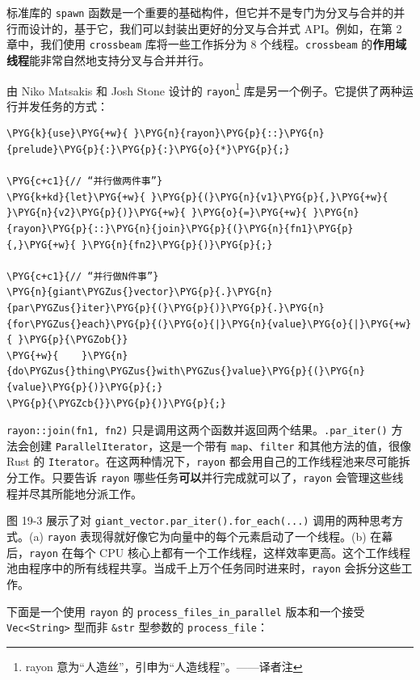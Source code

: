 标准库的 \texttt{spawn} 函数是一个重要的基础构件，但它并不是专门为分叉与合并的并行而设计的，基于它，我们可以封装出更好的分叉与合并式 API。例如，在第 2 章中，我们使用 \texttt{crossbeam} 库将一些工作拆分为 8 个线程。\texttt{crossbeam} 的\textbf{作用域线程}能非常自然地支持分叉与合并并行。

由 Niko Matsakis 和 Josh Stone 设计的 \texttt{rayon}\footnote{rayon 意为“人造丝”，引申为“人造线程”。——译者注} 库是另一个例子。它提供了两种运行并发任务的方式：

\begin{Verbatim}[commandchars=\\\{\},breaklines=true,breakanywhere=true,fontsize=\codefont,xleftmargin=17bp]
\PYG{k}{use}\PYG{+w}{ }\PYG{n}{rayon}\PYG{p}{::}\PYG{n}{prelude}\PYG{p}{:}\PYG{p}{:}\PYG{o}{*}\PYG{p}{;}

\PYG{c+c1}{// “并行做两件事”}
\PYG{k+kd}{let}\PYG{+w}{ }\PYG{p}{(}\PYG{n}{v1}\PYG{p}{,}\PYG{+w}{ }\PYG{n}{v2}\PYG{p}{)}\PYG{+w}{ }\PYG{o}{=}\PYG{+w}{ }\PYG{n}{rayon}\PYG{p}{::}\PYG{n}{join}\PYG{p}{(}\PYG{n}{fn1}\PYG{p}{,}\PYG{+w}{ }\PYG{n}{fn2}\PYG{p}{)}\PYG{p}{;}

\PYG{c+c1}{// “并行做N件事”}
\PYG{n}{giant\PYGZus{}vector}\PYG{p}{.}\PYG{n}{par\PYGZus{}iter}\PYG{p}{(}\PYG{p}{)}\PYG{p}{.}\PYG{n}{for\PYGZus{}each}\PYG{p}{(}\PYG{o}{|}\PYG{n}{value}\PYG{o}{|}\PYG{+w}{ }\PYG{p}{\PYGZob{}}
\PYG{+w}{    }\PYG{n}{do\PYGZus{}thing\PYGZus{}with\PYGZus{}value}\PYG{p}{(}\PYG{n}{value}\PYG{p}{)}\PYG{p}{;}
\PYG{p}{\PYGZcb{}}\PYG{p}{)}\PYG{p}{;}
\end{Verbatim}

\texttt{rayon::join(fn1, fn2)} 只是调用这两个函数并返回两个结果。\texttt{.par\_iter()} 方法会创建 \texttt{ParallelIterator}，这是一个带有 \texttt{map}、\texttt{filter} 和其他方法的值，很像 Rust 的 \texttt{Iterator}。在这两种情况下，\texttt{rayon} 都会用自己的工作线程池来尽可能拆分工作。只要告诉 \texttt{rayon} 哪些任务\textbf{可以}并行完成就可以了，\texttt{rayon} 会管理这些线程并尽其所能地分派工作。

图 19-3 展示了对 \texttt{giant\_vector.par\_iter().for\_each(...)} 调用的两种思考方式。(a) \texttt{rayon} 表现得就好像它为向量中的每个元素启动了一个线程。(b) 在幕后，\texttt{rayon} 在每个 CPU 核心上都有一个工作线程，这样效率更高。这个工作线程池由程序中的所有线程共享。当成千上万个任务同时进来时，\texttt{rayon} 会拆分这些工作。


下面是一个使用 \texttt{rayon} 的 \texttt{process\_files\_in\_parallel} 版本和一个接受 \texttt{Vec<String>} 型而非 \texttt{\&str} 型参数的 \texttt{process\_file}：


